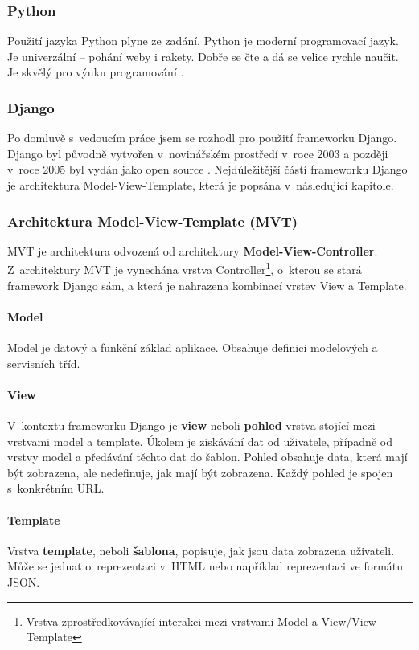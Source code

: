 \subsubsection{Python}
Použití jazyka Python plyne ze zadání. Python je moderní programovací jazyk. Je univerzální – pohání weby i rakety. Dobře se čte a dá se velice rychle naučit. Je skvělý pro výuku programování \cite{python-cz}.

\subsubsection{Django}
Po domluvě s~vedoucím práce jsem se rozhodl pro použití frameworku Django. Django byl původně vytvořen v~novinářském prostředí v~roce 2003 a později v~roce 2005 byl vydán jako open source \cite{djangobook, django-cr}. Nejdůležitější částí frameworku Django je architektura Model-View-Template, která je popsána v~následující kapitole.

\subsubsection{Architektura Model-View-Template (MVT)}
MVT je architektura odvozená od architektury \textbf{Model-View-Controller}. Z~architektury MVT je vynechána vrstva Controller\footnote{Vrstva zprostředkovávající interakci mezi vrstvami Model a View/View-Template}, o~kterou se stará framework Django sám, a která je nahrazena kombinací vrstev View a Template.

\paragraph*{Model}
Model je datový a funkční základ aplikace. Obsahuje definici modelových a servisních tříd.
\paragraph*{View}
V~kontextu frameworku Django je \textbf{view} neboli \textbf{pohled} vrstva stojící mezi vrstvami model a template. Úkolem je získávání dat od uživatele, případně od vrstvy model a předávání těchto dat do šablon. Pohled obsahuje data, která mají být zobrazena, ale nedefinuje, jak mají být zobrazena. Každý pohled je spojen s~konkrétním URL.
\paragraph*{Template}
Vrstva \textbf{template}, neboli \textbf{šablona}, popisuje, jak jsou data zobrazena uživateli. Může se jednat o~reprezentaci v~HTML nebo například reprezentaci ve formátu JSON.